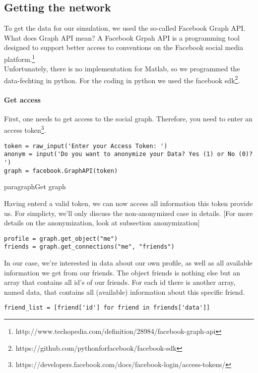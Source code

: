 
\subsection{Getting the network} 

To get the data for our simulation, we used the so-called Facebook Graph API. What does Graph API mean? 
A Facebook Grpah API is a programming tool designed to support better access to conventions on the Facebook social media platform.\footnote{http://www.techopedia.com/definition/28984/facebook-graph-api} 
\\
Unfortunately, there is no implementation for Matlab, so we programmed the data-fechting in python. For the coding in python we used the facebook sdk\footnote{https://github.com/pythonforfacebook/facebook-sdk}. 

\paragraph{Get access}

First, one needs to get access to the social graph. Therefore, you need to enter an access token\footnote{https://developers.facebook.com/docs/facebook-login/access-tokens/}. 

\begin{lstlisting} 
token = raw_input('Enter your Access Token: ')
anonym = input('Do you want to anonymize your Data? Yes (1) or No (0)? ')
graph = facebook.GraphAPI(token)

\end{lstlisting}

paragraph{Get graph}

Having enterd a valid token, we can now access all information this token provide us.  For simplicty, we'll only discuss  the non-anonymized case in details. [For more details on the anonymization, look at subsection anonymization]

\begin{lstlisting} 
profile = graph.get_object("me")
friends = graph.get_connections("me", "friends")
\end{lstlisting}

In our case, we're interested in data about our own profile, as well as all available information we get from our friends.
The object friends is nothing else but an array that contains all id's of our friends. For each id there is another array, named data, that contains all (available) information about this specific friend.  

\begin{lstlisting}
friend_list = [friend['id'] for friend in friends['data']]
\end{lstlisting}

